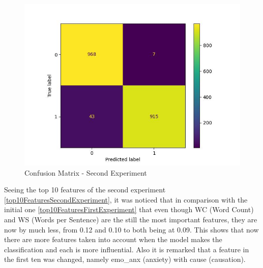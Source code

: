 \begin{figure}[htbp]
	\centering
		\includegraphics[scale=0.8]{LaTeX Bachelor Thesis Depression Signs Detection/figures/metrics/experiment2English/confusionMatrix.jpg}
	\caption{Confusion Matrix - Second Experiment}
	\label{confusionMatriSecondExperiment}
\end{figure}



Seeing the top 10 features of the second experiment \ref{top10FeaturesSecondExperiment}, it was noticed that in comparison with the initial one \ref{top10FeaturesFirstExperiment} that even though WC (Word Count) and WS (Words per Sentence) are the still the most important features, they are now by much less, from 0.12 and 0.10 to both being at 0.09. This shows that now there are more features taken into account when the model makes the classification and each is more influential. Also it is remarked that a feature in the first ten was changed, namely emo\_anx (anxiety) with cause (causation).

